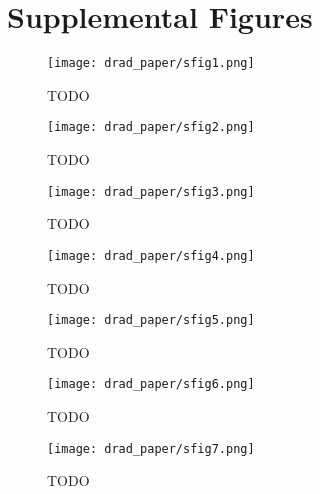 \newpage

\section{Supplemental Figures}

\begin{figure}[ht]
    \centering
    \texttt{[image: drad\_paper/sfig1.png]}
    \caption{TODO}
    \label{drad_sfig1}
\end{figure}

\begin{figure}[ht]
    \centering
    \texttt{[image: drad\_paper/sfig2.png]}
    \caption{TODO}
    \label{drad_sfig2}
\end{figure}

\begin{figure}[ht]
    \centering
    \texttt{[image: drad\_paper/sfig3.png]}
    \caption{TODO}
    \label{drad_sfig3}
\end{figure}

\begin{figure}[ht]
    \centering
    \texttt{[image: drad\_paper/sfig4.png]}
    \caption{TODO}
    \label{drad_sfig4}
\end{figure}

\begin{figure}[ht]
    \centering
    \texttt{[image: drad\_paper/sfig5.png]}
    \caption{TODO}
    \label{drad_sfig5}
\end{figure}

\begin{figure}[ht]
    \centering
    \texttt{[image: drad\_paper/sfig6.png]}
    \caption{TODO}
    \label{drad_sfig6}
\end{figure}

\begin{figure}[ht]
    \centering
    \texttt{[image: drad\_paper/sfig7.png]}
    \caption{TODO}
    \label{drad_sfig7}
\end{figure}

\FloatBarrier
